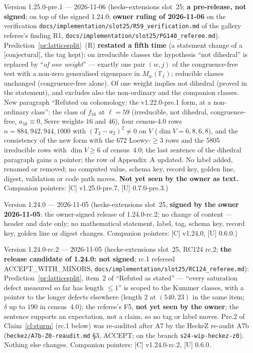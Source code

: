\documentclass[11pt]{article}
\theoremstyle{remark}
\newcommand{\F}{\mathbb{F}}
\newcommand{\Fl}{\F_\ell}
\newcommand{\CONJ}{\textsf{[conjectural]}}
\begin{document}
Version 1.25.0-pre.1 --- 2026-11-06 (hecke-extensions slot~25; \textbf{a pre-release, not signed}; on top of the signed 1.24.0; \textbf{owner ruling of 2026-11-06} on the verification \texttt{docs/implementation/slot25/R59\_verification.md} of the gallery referee's finding R1, \texttt{docs/implementation/slot25/PG140\_referee.md}). Prediction~\ref{pr:latticesplit}~(R) \textbf{restated a fifth time} (a statement change of a \CONJ, the tag kept): on irreducible classes the hypothesis ``not dihedral'' is replaced by ``\emph{of one weight}'' --- exactly one pair $(w,j)$ of the congruence-free test with a non-zero generalised eigenspace in $M_w(\Fl)$; reducible classes unchanged (congruence-free alone). Of one weight implies not dihedral (proved in the statement), and excludes also the non-ordinary and the companion classes. New paragraph ``Refuted on cohomology: the v1.22.0-pre.1 form, at a non-ordinary class'': the class of $f_{16}$ at $\ell=59$ (irreducible, not dihedral, congruence-free, $a_{59}\equiv0$, Serre weights $16$ and $46$), four census-4.0 rows $n=884,942,944,1000$ with $(T_2-a_2)^2\ne0$ on $V$ ($\dim V=6,8,6,8$), and the consistency of the new form with the $672$ Loewy-$\ge3$ rows and the $5805$ irreducible rows with $\dim V\ge6$ of census~4.0; the last sentence of the dihedral paragraph gains a pointer; the row of Appendix~A updated. No label added, renamed or removed; no computed value, schema key, record key, golden line, digest, validation or code path moves. \textbf{Not yet seen by the owner as text.} Companion pointers: [C] v1.25.0-pre.7, [U] 0.7.0-pre.3.)

Version 1.24.0 --- 2026-11-05 (hecke-extensions slot~25, \textbf{signed by the owner 2026-11-05}: the owner-signed release of 1.24.0-rc.2; no change of content --- header and date only; no mathematical statement, label, tag, schema key, record key, golden line or digest changes. Companion pointers: [C] v1.24.0, [U] 0.6.0.)

Version 1.24.0-rc.2 --- 2026-11-05 (hecke-extensions slot~25, RC124 rc.2; \textbf{the release candidate of 1.24.0: not signed}; rc.1 refereed ACCEPT\_WITH\_MINORS, \texttt{docs/implementation/slot25/RC124\_referee.md}): Prediction~\ref{pr:latticesplit}, item~2 of ``Refuted as stated'' --- ``every saturation defect measured so far has length $\le1$'' is scoped to the Kummer classes, with a pointer to the longer defects elsewhere (length $2$ at $(540,23)$ in the same item; $\delta$ up to $190$ in census~4.0); the referee's F5, \textbf{not yet seen by the owner}; the sentence supports an expectation, not a claim, so no tag or label moves. Pre.2 of Claim~\ref{cl:sturm} (rc.1 below) was re-audited after A7 by the HeckeZ re-audit A7b (\texttt{heckez/A7b-Z0-reaudit.md} \S3, ACCEPT; on the branch \texttt{s24-wip-heckez-z0}). Nothing else changes. Companion pointers: [C] v1.24.0-rc.2, [U] 0.6.0.
\end{document}
